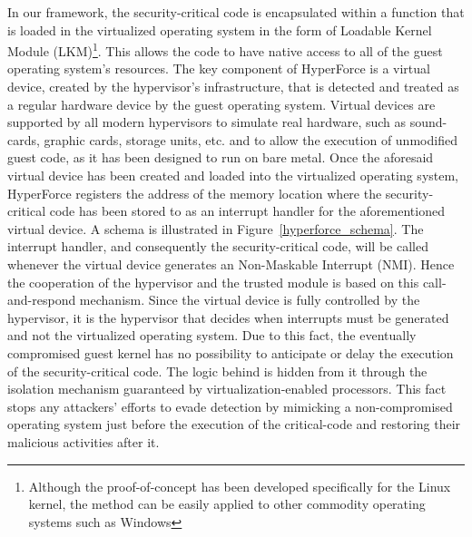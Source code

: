 In our framework, the security-critical code is encapsulated within a function that is loaded in the virtualized operating system in the form of Loadable Kernel Module (LKM)\footnote{Although the proof-of-concept has been developed specifically for the Linux kernel, the method can be easily applied to other commodity operating systems such as Windows}. This allows the code to have native access to all of the guest operating system's resources.
The key component of HyperForce is a virtual device, created by the hypervisor's infrastructure, that is detected and treated as a regular hardware device by the guest operating system.  
Virtual devices are supported by all modern hypervisors to simulate real hardware, such as sound-cards, graphic cards, storage units, etc. and to allow the execution of unmodified guest code, as it has been designed to run on bare metal. 
Once the aforesaid virtual device has been created and loaded into the virtualized operating system, HyperForce registers the address of the memory location where the security-critical code has been stored to as an interrupt handler for the aforementioned virtual device. A schema is illustrated in Figure~\ref{hyperforce_schema}. 
The interrupt handler, and consequently the security-critical code, will be called whenever the virtual device generates an Non-Maskable Interrupt (NMI). Hence the cooperation of the hypervisor and the trusted module is based on this call-and-respond mechanism.
Since the virtual device is fully controlled by the hypervisor, it is the hypervisor that decides when interrupts must be generated and not the virtualized operating system. Due to this fact, the eventually compromised guest kernel has no possibility to anticipate or delay the execution of the security-critical code. The logic behind is hidden from it through the isolation mechanism guaranteed by virtualization-enabled processors.  
This fact stops any attackers' efforts to evade detection by mimicking a non-compromised operating system just before the execution of the critical-code and restoring their malicious activities after it.

